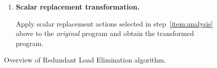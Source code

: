 \begin{figure}
{\begin{enumerate}
\begin{enumerate}
\item Compute $\DRS = \{\;  \mbox{def $A_i[\vec{k}]$} \; | \; \exists \; \mbox{use $A_j[\vec{x}] \in \URS$ with $\V(\vec{x})=\V(\vec{k})$} \; \}$ \ie\ def  $A_i[\vec{k}]$ is placed in \DRS\ 
if and only if a use $A_j[\vec{x}]$ was placed in \URS\ with  $\V(\vec{x})=\V(\vec{k})$.
\end{enumerate}

\item \label{item:transform}
{\bf Scalar replacement transformation.}

Apply scalar replacement actions selected in step~\ref{item:analysis}
above
to the {\it original} program and
obtain the transformed program.

\end{enumerate}
}
\caption{Overview of Redundant Load Elimination algorithm.}
\label{fig:overview}
\end{figure}

